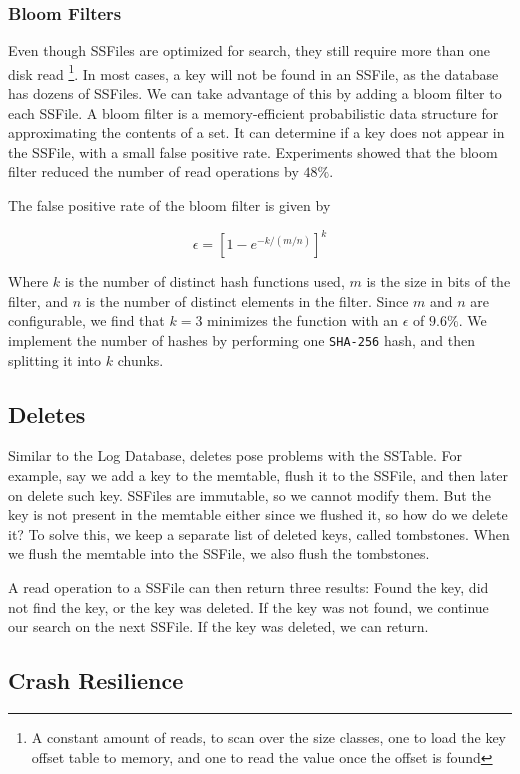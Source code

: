 \documentclass[10pt]{extarticle}
\begin{document}
\subsubsection{Bloom Filters}

Even though SSFiles are optimized for search, they still require more than one disk read \footnote{A constant amount of reads, to scan over the size classes, one to load the key offset table to memory, and one to read the value once the offset is found}. In most cases, a key will not be found in an SSFile, as the database has dozens of SSFiles. We can take advantage of this by adding a bloom filter to each SSFile. A bloom filter is a memory-efficient probabilistic data structure for approximating the contents of a set. It can determine if a key does not appear in the SSFile, with a small false positive rate. Experiments showed that the bloom filter reduced the number of read operations by $48\%$.

The false positive rate of the bloom filter is given by

$$\epsilon=[1-e^{-k/({m/n})}]^k$$

Where $k$ is the number of distinct hash functions used, $m$ is the size in bits of the filter, and $n$ is the number of distinct elements in the filter. Since $m$ and $n$ are configurable, we find that $k=3$ minimizes the function with an $\epsilon$ of $9.6\%$. We implement the number of hashes by performing one \lstinline|SHA-256| hash, and then splitting it into $k$ chunks.

\subsection{Deletes}

Similar to the Log Database, deletes pose problems with the SSTable. For example, say we add a key to the memtable, flush it to the SSFile, and then later on delete such key. SSFiles are immutable, so we cannot modify them. But the key is not present in the memtable either since we flushed it, so how do we delete it? To solve this, we keep a separate list of deleted keys, called tombstones. When we flush the memtable into the SSFile, we also flush the tombstones. 

A read operation to a SSFile can then return three results: Found the key, did not find the key, or the key was deleted. If the key was not found, we continue our search on the next SSFile. If the key was deleted, we can return.

\subsection{Crash Resilience}
\end{document}
